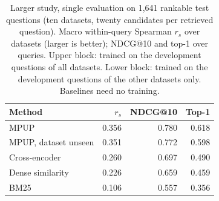 \documentclass[conference]{IEEEtran}
\begin{document}
\begin{table}[htbp]
    \centering
    \caption{Larger study, single evaluation on 1,641 rankable test questions (ten datasets, twenty candidates per retrieved question). Macro within-query Spearman $r_s$ over datasets (larger is better); NDCG@10 and top-1 over queries. Upper block: trained on the development questions of all datasets. Lower block: trained on the development questions of the other datasets only. Baselines need no training.}
    \label{tab:big}
    \footnotesize
    \begin{tabular}{lrrr}
        \toprule
        \textbf{Method} & \textbf{$r_s$} & \textbf{NDCG@10} & \textbf{Top-1} \\
        \midrule
        MPUP & 0.356 & 0.780 & 0.618 \\
        \midrule
        MPUP, dataset unseen & 0.351 & 0.772 & 0.598 \\
        \midrule
        Cross-encoder & 0.260 & 0.697 & 0.490 \\
        Dense similarity & 0.226 & 0.659 & 0.459 \\
        BM25 & 0.106 & 0.557 & 0.356 \\
        \bottomrule
    \end{tabular}
\end{table}
\end{document}
